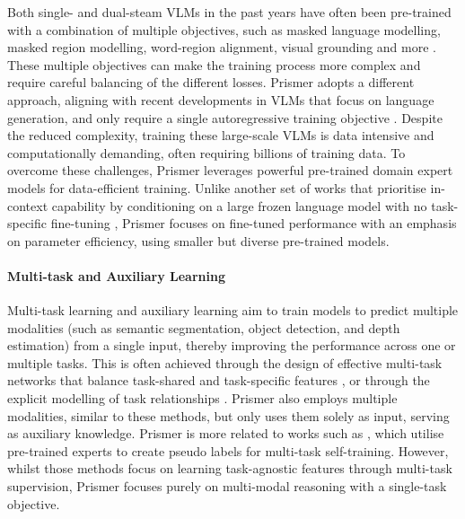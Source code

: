 \documentclass[11pt]{article}
\begin{document}
Both single- and dual-steam VLMs in the past years have often been pre-trained with a combination of multiple objectives, such as masked language modelling, masked region modelling, word-region alignment, visual grounding and more \cite{li2020visualbert,cho2021vlt5,li2022blip,li2021albef,lu2019vilbert}. These multiple objectives can make the training process more complex and require careful balancing of the different losses. Prismer adopts a different approach, aligning with recent developments in VLMs that focus on language generation, and only require a single autoregressive training objective  \cite{wang2022git,wang2021simvlm,hu2022lemon}. Despite the reduced complexity, training these large-scale VLMs is data intensive and computationally demanding, often requiring billions of training data. To overcome these challenges, Prismer leverages powerful pre-trained domain expert models for data-efficient training. Unlike another set of works that prioritise in-context capability by conditioning on a large frozen language model with no task-specific fine-tuning \cite{eichenberg2021magma,tsimpoukelli2021frozen,alayrac2022flamingo}, Prismer focuses on fine-tuned performance with an emphasis on parameter efficiency, using smaller but diverse pre-trained models.

\paragraph{Multi-task and Auxiliary Learning} Multi-task learning and auxiliary learning aim to train models to predict multiple modalities (such as semantic segmentation, object detection, and depth estimation) from a single input, thereby improving the performance across one or multiple tasks. This is often achieved through the design of effective multi-task networks that balance task-shared and task-specific features \cite{shikun2019mtan,misra2016cross_stitch,sun2019adashare,xu2018padnet}, or through the explicit modelling of task relationships \cite{shikun2019maxl,shikun2022auto_lambda,navon2021auxilearn,zamir2018taskonomy,fifty2021tag}.  Prismer also employs multiple modalities, similar to these methods, but only uses them solely as input, serving as auxiliary knowledge. Prismer is more related to works such as \cite{bachmann2022multimae,ghiasi2021must}, which utilise pre-trained experts to create pseudo labels for multi-task self-training. However, whilst those methods focus on learning task-agnostic features through multi-task supervision, Prismer focuses purely on multi-modal reasoning with a single-task objective.
\end{document}
